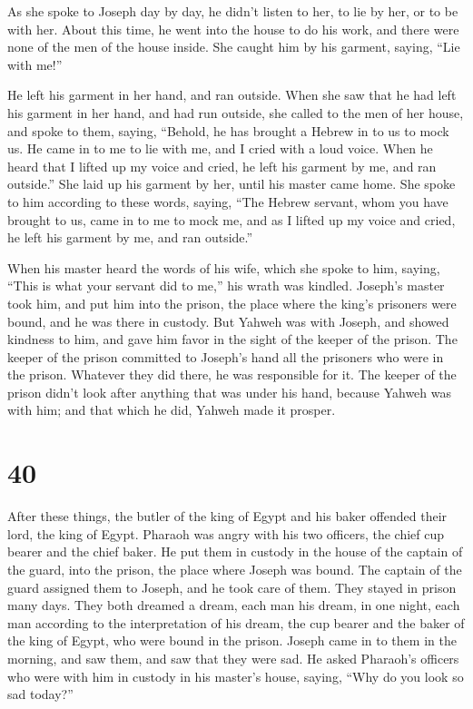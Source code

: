  As she spoke to Joseph day by day, he didn't listen to
her, to lie by her, or to be with her.  About this time,
he went into the house to do his work, and there were none of the men of
the house inside.  She caught him by his garment, saying,
``Lie with me!''

He left his garment in her hand, and ran outside.  When
she saw that he had left his garment in her hand, and had run outside,
 she called to the men of her house, and spoke to them,
saying, ``Behold, he has brought a Hebrew in to us to mock us. He came
in to me to lie with me, and I cried with a loud voice. 
When he heard that I lifted up my voice and cried, he left his garment
by me, and ran outside.''  She laid up his garment by
her, until his master came home.  She spoke to him
according to these words, saying, ``The Hebrew servant, whom you have
brought to us, came in to me to mock me,  and as I lifted
up my voice and cried, he left his garment by me, and ran outside.''

 When his master heard the words of his wife, which she
spoke to him, saying, ``This is what your servant did to me,'' his wrath
was kindled.  Joseph's master took him, and put him into
the prison, the place where the king's prisoners were bound, and he was
there in custody.  But Yahweh was with Joseph, and showed
kindness to him, and gave him favor in the sight of the keeper of the
prison.  The keeper of the prison committed to Joseph's
hand all the prisoners who were in the prison. Whatever they did there,
he was responsible for it.  The keeper of the prison
didn't look after anything that was under his hand, because Yahweh was
with him; and that which he did, Yahweh made it prosper.

\hypertarget{section-39}{%
\section{40}\label{section-39}}

 After these things, the butler of the king of Egypt and
his baker offended their lord, the king of Egypt.  Pharaoh
was angry with his two officers, the chief cup bearer and the chief
baker.  He put them in custody in the house of the captain
of the guard, into the prison, the place where Joseph was bound.
 The captain of the guard assigned them to Joseph, and he
took care of them. They stayed in prison many days.  They
both dreamed a dream, each man his dream, in one night, each man
according to the interpretation of his dream, the cup bearer and the
baker of the king of Egypt, who were bound in the prison. 
Joseph came in to them in the morning, and saw them, and saw that they
were sad.  He asked Pharaoh's officers who were with him
in custody in his master's house, saying, ``Why do you look so sad
today?''

